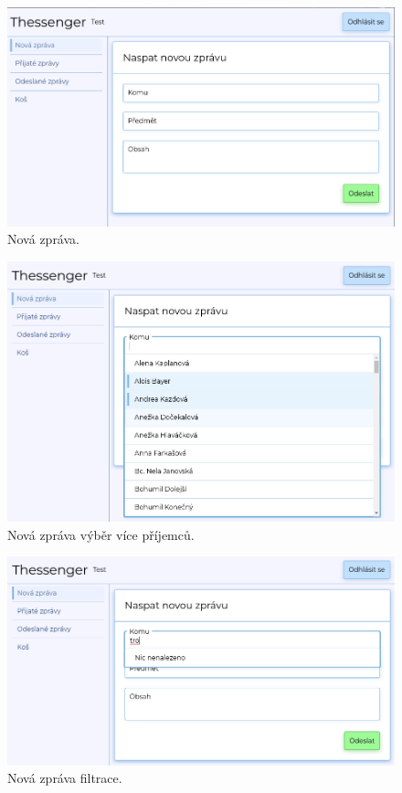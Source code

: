 \documentclass[
  master,
  program=ainf,
  printversion,
  tables=false,
  sourcecodes,
  glossaries,
  index
]{kidiplom}
\begin{document}
\begin{figure}[H]
  \centering
  \includegraphics[width=\textwidth]{graphics/thessenger_new_message.png}
  \caption{Nová zpráva.}
  \label{fig:new_message}
\end{figure}

\begin{figure}[H]
  \centering
  \includegraphics[width=\textwidth]{graphics/thessenger_new_message_multi_select.png}
  \caption{Nová zpráva výběr více příjemců.}
  \label{fig:new_message_multiselect}
\end{figure}

\begin{figure}[H]
  \centering
  \includegraphics[width=\textwidth]{graphics/thessenger_new_message_nothing_found.png}
  \caption{Nová zpráva filtrace.}
  \label{fig:new_message_filtration}
\end{figure}
\end{document}

